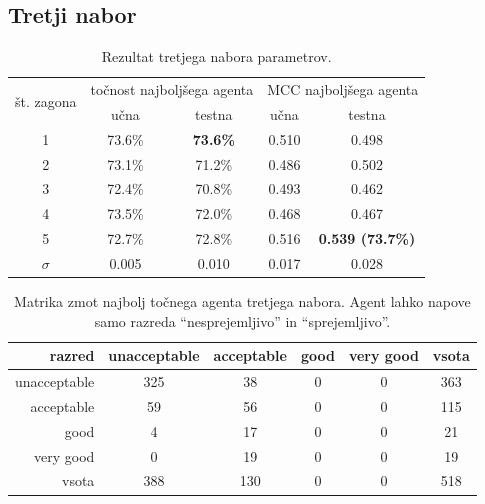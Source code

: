 \subsection{Tretji nabor}\label{subsec:dodatek-car-tretji-nabor}
\begin{table}[H]
    \begin{center}
        \begin{tabular}{|| c | c c || c c ||}
            \hline
            \multirow{2}{*}{št. zagona} & \multicolumn{2}{c||}{točnost najboljšega agenta} & \multicolumn{2}{c||}{MCC najboljšega agenta} \\ \cline{2-5}
            & učna   & testna          & učna  & testna                  \\
            \hline
            1        & 73.6\% & \textbf{73.6\%} & 0.510 & 0.498                   \\
            \hline
            2        & 73.1\% & 71.2\%          & 0.486 & 0.502                   \\
            \hline
            3        & 72.4\% & 70.8\%          & 0.493 & 0.462                   \\
            \hline
            4        & 73.5\% & 72.0\%          & 0.468 & 0.467                   \\
            \hline
            5        & 72.7\% & 72.8\%          & 0.516 & \textbf{0.539 (73.7\%)} \\
            \hline
            $\sigma$ & 0.005  & 0.010           & 0.017 & 0.028                   \\
            \hline
        \end{tabular}
    \end{center}
    \caption{Rezultat tretjega nabora parametrov.}
    \label{tab:car_result_3}
\end{table}

\begin{table}[H]
    \centering
    \begin{tabular}{||rccccc||}
        \hline
        razred       & unacceptable & acceptable & good & very good & vsota \\ \hline
        unacceptable & 325          & 38         & 0    & 0         & 363   \\ \hline
        acceptable   & 59           & 56         & 0    & 0         & 115   \\ \hline
        good         & 4            & 17         & 0    & 0         & 21    \\ \hline
        very good    & 0            & 19         & 0    & 0         & 19    \\ \hline
        vsota        & 388          & 130        & 0    & 0         & 518   \\ \hline
    \end{tabular}
    \caption{Matrika zmot najbolj točnega agenta tretjega nabora. Agent lahko napove samo razreda \enquote{nesprejemljivo} in \enquote{sprejemljivo}.}
    \label{tab:car_acc_3}
\end{table}

